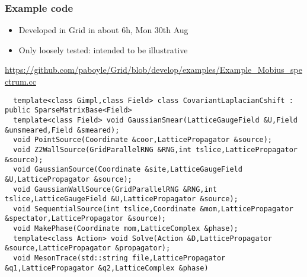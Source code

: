 \documentclass[pdf,ps,8pt]{beamer}
\begin{document}
\begin{frame}[fragile]\small\frametitle{ Example code}
  \begin{itemize}
    \item Developed in Grid in about 6h, Mon 30th Aug
    \item Only loosely tested: intended to be illustrative
  \end{itemize}
  \href{https://github.com/paboyle/Grid/blob/develop/examples/Example_Mobius_spectrum.cc}
  {\color{blue}https://github.com/paboyle/Grid/blob/develop/examples/Example\_Mobius\_spectrum.cc}
{\tiny
\begin{verbatim}
  template<class Gimpl,class Field> class CovariantLaplacianCshift : public SparseMatrixBase<Field>
  template<class Field> void GaussianSmear(LatticeGaugeField &U,Field &unsmeared,Field &smeared);
  void PointSource(Coordinate &coor,LatticePropagator &source);
  void Z2WallSource(GridParallelRNG &RNG,int tslice,LatticePropagator &source);
  void GaussianSource(Coordinate &site,LatticeGaugeField &U,LatticePropagator &source);
  void GaussianWallSource(GridParallelRNG &RNG,int tslice,LatticeGaugeField &U,LatticePropagator &source);
  void SequentialSource(int tslice,Coordinate &mom,LatticePropagator &spectator,LatticePropagator &source);
  void MakePhase(Coordinate mom,LatticeComplex &phase);
  template<class Action> void Solve(Action &D,LatticePropagator &source,LatticePropagator &propagator);
  void MesonTrace(std::string file,LatticePropagator &q1,LatticePropagator &q2,LatticeComplex &phase)
\end{verbatim}
}  

\end{frame}
\end{document}
